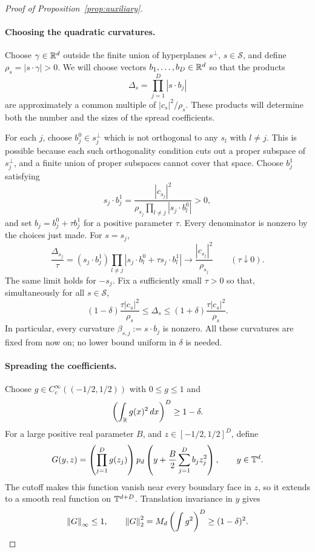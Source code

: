 \begin{proof}[Proof of Proposition~\ref{prop:auxiliary}]
\paragraph{Choosing the quadratic curvatures.}
Choose $\gamma\in\mathbb R^d$ outside the finite union of hyperplanes
$s^\perp$, $s\in\mathcal S$, and define
$\rho_s=|s\cdot\gamma|>0$.  We will choose vectors
$b_1,\ldots,b_D\in\mathbb R^d$ so that the products
\[
 \Delta_s=\prod_{j=1}^D|s\cdot b_j|
\]
are approximately a common multiple of $|c_s|^2/\rho_s$.
These products will determine both the number and the sizes of the
spread coefficients.

For each $j$, choose $b_j^0\in s_j^\perp$ which is not orthogonal to
any $s_l$ with $l\ne j$.  This is possible because each such
orthogonality condition cuts out a proper subspace of $s_j^\perp$,
and a finite union of proper subspaces cannot cover that space.
Choose $b_j^1$ satisfying
\[
 s_j\cdot b_j^1
 =\frac{|c_{s_j}|^2}
 {\rho_{s_j}\prod_{l\ne j}|s_j\cdot b_l^0|}>0,
\]
and set $b_j=b_j^0+\tau b_j^1$ for a positive parameter $\tau$.
Every denominator is nonzero by the choices just made.  For $s=s_j$,
\[
 \frac{\Delta_{s_j}}\tau
 =(s_j\cdot b_j^1)
   \prod_{l\ne j}|s_j\cdot b_l^0+\tau s_j\cdot b_l^1|
 \longrightarrow\frac{|c_{s_j}|^2}{\rho_{s_j}}
 \qquad(\tau\downarrow0).
\]
The same limit holds for $-s_j$.  Fix a sufficiently small $\tau>0$
so that, simultaneously for all $s\in\mathcal S$,
\begin{equation}
 \label{eq:determinant-tuning}
 (1-\delta)\frac{\tau|c_s|^2}{\rho_s}
 \le\Delta_s\le
 (1+\delta)\frac{\tau|c_s|^2}{\rho_s}.
\end{equation}
In particular, every curvature
$\beta_{s,j}:=s\cdot b_j$ is nonzero.  All these curvatures are fixed
from now on; no lower bound uniform in $\delta$ is needed.

\paragraph{Spreading the coefficients.}
Choose $g\in C_c^\infty((-1/2,1/2))$ with $0\le g\le1$ and
\[
 \left(\int_{\mathbb R}g(x)^2\,dx\right)^D\ge1-\delta.
\]
For a large positive real parameter $B$, and
$z\in[-1/2,1/2]^D$, define
\begin{equation}
 \label{eq:spread-function}
 G(y,z)=\left(\prod_{j=1}^Dg(z_j)\right)
 p_d\left(y+\frac B2\sum_{j=1}^Db_jz_j^2\right),
 \qquad y\in\mathbb T^d.
\end{equation}
The cutoff makes this function vanish near every boundary face in
$z$, so it extends to a smooth real function on $\mathbb T^{d+D}$.
Translation invariance in $y$ gives
\begin{equation}
 \label{eq:spread-norms}
 \left\lVert G\right\rVert_\infty\le1,
 \qquad
 \left\lVert G\right\rVert_2^2=M_d\left(\int g^2\right)^D\ge(1-\delta)^2.
\end{equation}


\end{proof}
